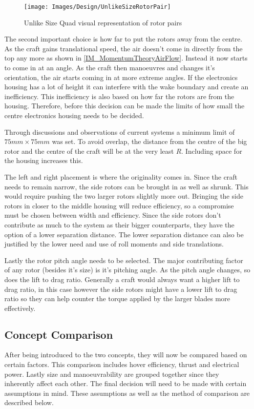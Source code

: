			\begin{figure}[H]
			\centering
			\texttt{[image: Images/Design/UnlikeSizeRotorPair]}
			\caption{Unlike Size Quad visual representation of rotor pairs}
			\label{IM_UnlikeSizePair}
			\end{figure}
			
			The second important choice is how far to put the rotors away from the centre. As the craft gains translational speed, the air doesn't come in directly from the top any more as shown in \ref{IM_MomentumTheoryAirFlow}. Instead it now starts to come in at an angle. As the craft then manoeuvres and changes it's orientation, the air starts coming in at more extreme angles. If the electronics housing has a lot of height it can interfere with the wake boundary and create an inefficiency. This inefficiency is also based on how far the rotors are from the housing. Therefore, before this decision can be made the limits of how small the centre electronics housing needs to be decided. 
			
			Through discussions and observations of current systems a minimum limit of $75mm \times 75mm$ was set. To avoid overlap, the distance from the centre of the big rotor and the centre of the craft will be at the very least $R$. Including space for the housing increases this.
			
			The left and right placement is where the originality comes in. Since the craft needs to remain narrow, the side rotors can be brought in as well as shrunk. This would require pushing the two larger rotors slightly more out. Bringing the side rotors in closer to the middle housing will reduce efficiency, so a compromise must be chosen between width and efficiency. Since the side rotors don't contribute as much to the system as their bigger counterparts, they have the option of a lower separation distance. The lower separation distance can also be justified by the lower need and use of roll moments and side translations.
			
			Lastly the rotor pitch angle needs to be selected. The major contributing factor of any rotor (besides it's size) is it's pitching angle. As the pitch angle changes, so does the lift to drag ratio. Generally a craft would always want a higher lift to drag ratio, in this case however the side rotors might have a lower lift to drag ratio so they can help counter the torque applied by the larger blades more effectively.
	
		\subsection{Concept Comparison}
		After being introduced to the two concepts, they will now be compared based on certain factors. This comparison includes hover efficiency, thrust and electrical power. Lastly size and manoeuvrability are grouped together since they inherently affect each other. The final decision will need to be made with certain assumptions in mind. These assumptions as well as the method of comparison are described below. 
	
